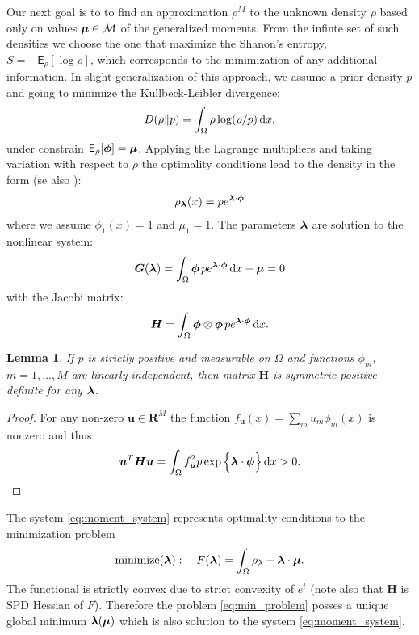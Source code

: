 \documentclass{article}
\newtheorem{lemma}[theorem]{Lemma}
\def\d{\,{\rm d}}               %
\def\vc#1{\mathbf{\boldsymbol{#1}}}     %
\def\tn#1{\boldsymbol{#1}}
\def \E{{\mathsf E}}
\def\R{\mathbf{R}}
\begin{document}
Our next goal is to to find an approximation $\rho^M$ to the unknown density $\rho$ based only on values $\vmu \in \mathcal M$ of the generalized moments. From the infinte set of such densities we choose the one that maximize the Shanon's entropy,
$S = -\E_\rho[\log \rho]$,
which corresponds to the minimization of any additional information. 
In slight generalization of this approach, we assume a prior density $p$ and going to minimize the Kullbeck-Leibler divergence:
\[
    D(\rho\Vert p) = \int_\Omega \rho \log(\rho / p) \d x,
\]
under constrain $\E_\rho[ \vphi ] = \vmu$. 
Applying the Lagrange multipliers and taking variation with respect to $\rho$ the optimality conditions lead to the density in the form (se also \cite{...}):
\[
    \rho_{\vl}(x) = p e^{\vl\cdot\vphi}
\]
where we assume $\phi_1(x) = 1$ and $\mu_1 =1$. The parameters $\vl$ are solution
to the nonlinear system:
\begin{equation}
    \label{eq:moment_system}
    \vc G(\vl) = \int_\Omega \vphi\, p e^{\vl\cdot \vphi}\d x - \vmu = 0
\end{equation}
with the Jacobi matrix:
\[
    \tn H = \int_\Omega \vphi \otimes \vphi\, 
    p e^{\vl\cdot\vphi} \d x.
\]
\begin{lemma}
If $p$ is strictly positive and measurable on $\Omega$ and functions $\phi_m$,  $m=1,\dots,M$ are linearly independent, then matrix $\tn H$ is symmetric positive definite for any $\vl$.
\end{lemma}
\begin{proof}
For any non-zero $\vc u \in \R^M$ the function $f_{\vc u}(x) = \sum_m u_m \phi_m(x)$ is nonzero and thus
\[
    \vc u^T \tn H \vc u = \int_{\Omega} f_{\vc u}^2 p \exp\Big\{ \vc\lambda\cdot \vc\phi\Big\} \d x > 0.
\]
\end{proof}
The system \eqref{eq:moment_system} represents optimality conditions to the minimization problem
\begin{equation}
    \label{eq:min_problem}
    \text{minimize}(\vc\lambda):\quad F(\vl) = \int_{\Omega} \rho_{\lambda} - \vl\cdot\vmu.
\end{equation}
The functional is strictly convex due to strict convexity of $e^t$ (note also that $\tn H$ is SPD Hessian of $F$). 
Therefore the problem \eqref{eq:min_problem} posses a unique global minimum $\vl(\vmu)$ which is
also solution to the system \eqref{eq:moment_system}.
\end{document}
